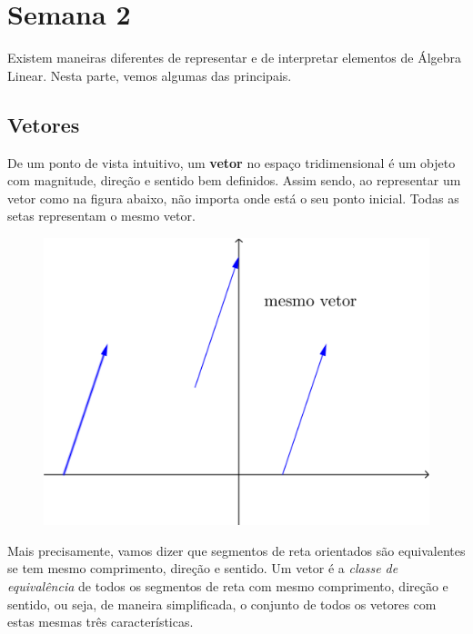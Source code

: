 

\providecommand{\dir}{..}


%

\chapter{Semana 2}

\vspace{0.5cm}

Existem maneiras diferentes de representar e de interpretar elementos de Álgebra Linear. Nesta parte, vemos algumas das principais.


\section{Vetores}

De um ponto de vista intuitivo, um \textbf{vetor} no espaço tridimensional é um objeto com magnitude, direção e sentido bem definidos. Assim sendo, ao representar um vetor como na figura abaixo, não importa onde está o seu ponto inicial. Todas as setas representam o mesmo vetor.


\begin{figure}[h!]
	\begin{center}
		\includegraphics[width=0.3\linewidth]{Semana02/semana02-vetor}
	\end{center}
\end{figure}

Mais precisamente, %
vamos dizer que segmentos de reta orientados  são equivalentes se tem mesmo comprimento, direção e sentido. Um vetor é a {\it classe de equivalência} de todos os segmentos de reta com mesmo comprimento, direção e sentido, ou seja, de maneira simplificada, o conjunto de todos os vetores com estas mesmas três características.

